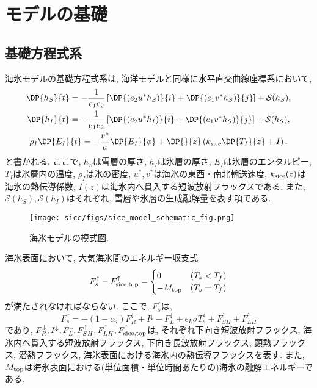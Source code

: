 \section{モデルの基礎}\label{sice_model_basic}
\subsection{基礎方程式系}
海氷モデルの基礎方程式系は, 海洋モデルと同様に水平直交曲線座標系において, 
\begin{subequations} 
\label{eq:sice_model_basic_equations}
\begin{gather}
  \DP{h_S}{t} =
    - \dfrac{1}{e_1 e_2} \left[ 
       \DP{(e_2 u^* h_S)}{i} + \DP{(e_1 v^* h_S)}{j} 
      \right] + \mathcal{S}(h_S),  \\
  \DP{h_I}{t} =
    - \dfrac{1}{e_1 e_2} \left[ 
       \DP{(e_2 u^* h_I)}{i} + \DP{(e_1 v^* h_S)}{j} 
      \right] + \mathcal{S}(h_S),  \\
  \rho_I \DP{E_I}{t} = 
     - \dfrac{v^*}{a} \DP{E_I}{\phi} 
     + \DP{}{z} \left(k_{\rm sice} \DP{T_I}{z} + I \right). 
 \end{gather}
\end{subequations}
と書かれる. 
ここで, $h_S$は雪層の厚さ, $h_I$は氷層の厚さ, 
$E_I$は氷層のエンタルピー, $T_I$は氷層内の温度, $\rho_I$は氷の密度, 
$u^*, v^*$は海氷の東西・南北輸送速度, 
$k_{\rm sice}(z)$は海氷の熱伝導係数, 
$I(z)$は海氷内へ貫入する短波放射フラックスである. 
また, $\mathcal{S}(h_S), \mathcal{S}(h_I)$はそれぞれ, 雪層や氷層の生成融解量を表す項である.  

\begin{figure}[tb]
\begin{center}
 \texttt{[image: sice/figs/sice\_model\_schematic\_fig.png]}
 \caption[]
{\footnotesize
海氷モデルの模式図.  
}
\label{fig:sice_model_schematic_fig}
\end{center} 
\end{figure}
海氷表面において, 大気海氷間のエネルギー収支式
\begin{equation}
  F_s^\uparrow - F_{\rm sice,top}^\uparrow
  = \begin{cases}
      0                   & (T_s < T_f) \\
     -M_{\rm top}      & (T_s = T_f)
    \end{cases}
\label{eq:sice_model_surface_energy_budget}
\end{equation}
が満たされなければならない.  
ここで,  $F_s^\uparrow$は, 
$$
F_s^\uparrow 
= - (1 - \alpha_i) F_R^\downarrow 
  + I^\downarrow
  - F_L^\downarrow 
  + \epsilon_L \sigma T_s^4 
  + F_{SH}^\uparrow + F_{LH}^\uparrow
$$
であり, 
$F_R^\downarrow, I^\downarrow, F_L^\downarrow, F_{SH}^\uparrow,
F_{LH}^\uparrow, F_{\rm sice, top}^\uparrow$は, 
それぞれ下向き短波放射フラックス, 海氷内へ貫入する短波放射フラックス, 下向き長波放射フラックス,
顕熱フラックス, 潜熱フラックス, 海氷表面における海氷内の熱伝導フラックスを表す.
また, $M_{\rm top}$は海氷表面における(単位面積・単位時間あたりの)海氷の融解エネルギーである. 

